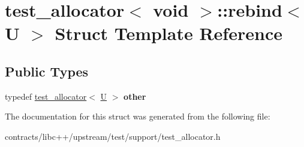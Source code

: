 \hypertarget{structtest__allocator_3_01void_01_4_1_1rebind}{}\section{test\+\_\+allocator$<$ void $>$\+:\+:rebind$<$ U $>$ Struct Template Reference}
\label{structtest__allocator_3_01void_01_4_1_1rebind}
\subsection*{Public Types}
\begin{DoxyCompactItemize}
\item 
\mbox{\label{structtest__allocator_3_01void_01_4_1_1rebind_a1b956c55cc7228dd6a025b506cc53697}} 
typedef \mbox{\hyperlink{classtest__allocator}{test\+\_\+allocator}}$<$ \mbox{\hyperlink{union_u}{U}} $>$ {\bfseries other}
\end{DoxyCompactItemize}


The documentation for this struct was generated from the following file\+:\begin{DoxyCompactItemize}
\item 
contracts/libc++/upstream/test/support/test\+\_\+allocator.\+h\end{DoxyCompactItemize}
